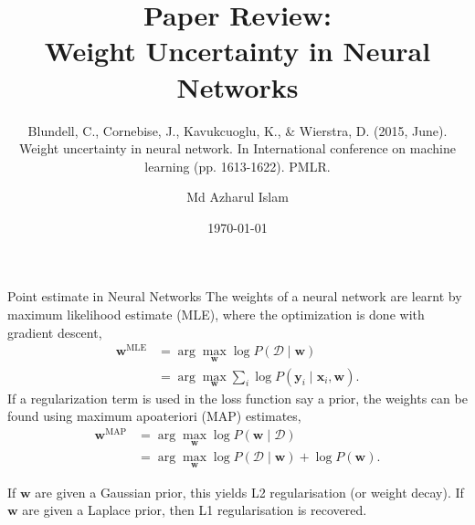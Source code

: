 \documentclass[8pt,xcolor=dvipsnames,compress]{beamer}
\title[Fall,2019]{
Paper Review:\\
Weight Uncertainty in Neural Networks
}
\subtitle{Blundell, C., Cornebise, J., Kavukcuoglu, K., & Wierstra, D. (2015, June). Weight uncertainty in neural network. In International conference on machine learning (pp. 1613-1622). PMLR.}
\author{Md Azharul Islam}
\institute[UB]{Advisor:  Dr. Danial Faghihi\\University at Buffalo\\}
\date[\today]{\today}
\begin{document}
\maketitle


\begin{frame}{Point estimate in Neural Networks}
The weights of a neural network are learnt by maximum likelihood estimate (MLE), where the optimization is done with gradient descent, 
\begin{equation}
\begin{aligned}
\mathbf{w}^{\mathrm{MLE}} & =\arg \max _{\mathbf{w}} \log P(\mathcal{D} \mid \mathbf{w}) \\
& =\arg \max _{\mathbf{w}} \sum_{i} \log P\left(\mathbf{y}_{i} \mid \mathbf{x}_{i}, \mathbf{w}\right) .
\end{aligned}
\end{equation}
If a regularization term is used in the loss function say a prior, the weights can be found using maximum apoateriori (MAP) estimates,
\begin{equation}
\begin{aligned}
\mathbf{w}^{\mathrm{MAP}} & =\arg \max _{\mathbf{w}} \log P(\mathbf{w} \mid \mathcal{D}) \\
& =\arg \max _{\mathbf{w}} \log P(\mathcal{D} \mid \mathbf{w})+\log P(\mathbf{w}) .
\end{aligned}
\end{equation}

If $\mathbf{w}$ are given a Gaussian prior, this yields L2 regularisation (or weight decay). If $\mathbf{w}$ are given a Laplace prior, then L1 regularisation is recovered.
\end{frame}
\end{document}
